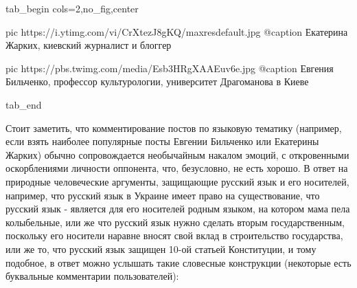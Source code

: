 \ifcmt
  tab_begin cols=2,no_fig,center

     pic https://i.ytimg.com/vi/CrXtezJ8gKQ/maxresdefault.jpg
		 @caption Екатерина Жарких, киевский журналист и блоггер

		 pic https://pbs.twimg.com/media/Esb3HRgXAAEuv6e.jpg
		 @caption Евгения Бильченко, профессор культурологии, университет Драгоманова в Киеве 

  tab_end
\fi

Стоит заметить, что комментирование постов по языковую тематику (например, если
взять наиболее популярные посты Евгении Бильченко или Екатерины Жарких) обычно
сопровождается необычайным накалом эмоций, с откровенными оскорблениями
личности оппонента, что, безусловно, не есть хорошо. В ответ на природные
человеческие аргументы, защищающие русский язык и его носителей, например, что
русский язык в Украине имеет право на существование, что русский язык -
является для его носителей родным языком, на котором мама пела колыбельные, или
же что русский язык нужно сделать вторым государственным, поскольку его 
носители наравне вносят свой вклад в строительство государства, или же то, что
русский язык защищен 10-ой статьей Конституции, и тому подобное, в ответ можно
услышать такие словесные конструкции (некоторые есть буквальные комментарии
пользователей):

